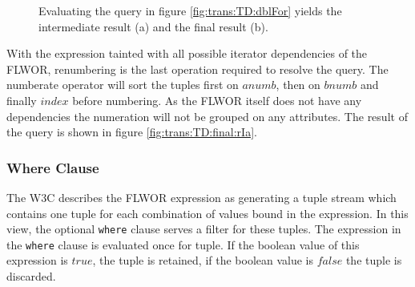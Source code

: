 \begin{myExample}
\begin{figure}[h]
\centering
{}
\qquad
{}
\caption[Example: resolving simple FLWOR]{Evaluating the query in figure \ref{fig:trans:TD:dblFor} yields the
intermediate result (a) and the final result (b).\label{fig:trans:TD:finalizeExp}}
\end{figure}

With the expression tainted with all possible iterator dependencies of the FLWOR, renumbering is the last
operation required to resolve the query. The \textsf{numberate} operator will sort the tuples first on $anumb$,
then on $bnumb$ and finally $index$ before numbering. As the FLWOR itself does not have any dependencies the
numeration will not be grouped on any attributes. The result of the query is shown in figure
\ref{fig:trans:TD:final:rIa}.
\end{myExample}

\subsubsection{Where Clause}
The W3C describes the FLWOR expression as generating a tuple stream which contains one tuple for each combination
of values bound in the expression\cite{w3c00}. In this view, the optional \texttt{where} clause serves a filter for
these tuples. The expression in the \texttt{where} clause is evaluated once for tuple. If the boolean value of this
expression is $true$, the tuple is retained, if the boolean value is $false$ the tuple is discarded.

